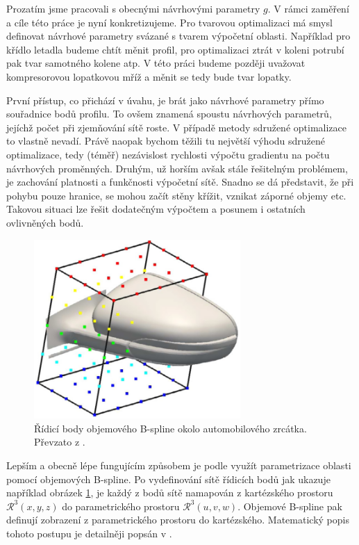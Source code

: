Prozatím jsme pracovali s obecnými návrhovými parametry $ g $. V rámci zaměření a cíle této práce je nyní konkretizujeme. Pro tvarovou optimalizaci má smysl definovat návrhové parametry svázané s tvarem výpočetní oblasti. Například pro křídlo letadla budeme chtít měnit profil, pro optimalizaci ztrát v koleni potrubí pak tvar samotného kolene atp. V této práci budeme později uvažovat kompresorovou lopatkovou mříž a měnit se tedy bude tvar lopatky.

První přístup, co přichází v úvahu, je brát jako návrhové parametry přímo souřadnice bodů profilu. To ovšem znamená spoustu návrhových parametrů, jejíchž počet při zjemňování sítě roste. V případě metody sdružené optimalizace to vlastně nevadí. Právě naopak bychom těžili tu největší výhodu sdružené optimalizace, tedy (téměř) nezávislost rychlosti výpočtu gradientu na počtu návrhových proměnných. Druhým, už horším avšak stále řešitelným problémem, je zachování platnosti a funkčnosti výpočetní sítě. Snadno se dá představit, že při pohybu pouze hranice, se mohou začít stěny křížit, vznikat záporné objemy etc. Takovou situaci lze řešit dodatečným výpočtem a posunem i ostatních ovlivněných bodů. 
\begin{figure}
	\includegraphics[width=0.7\textwidth]{./img/ridici_body.png}
	\caption[Řídicí body objemového B-spline ve 3D]{Řídicí body objemového B-spline okolo automobilového zrcátka. Převzato z \cite{papoutsis2015noise}.}
	\label{fig:zrcatko}
\end{figure}
Lepším a obecně lépe fungujícím způsobem je podle \cite{adjoint2020foam} využít parametrizace oblasti pomocí objemových B-spline.
Po vydefinování sítě řídicích bodů jak ukazuje například obrázek \ref{fig:zrcatko}, je každý z bodů sítě namapován z kartézského prostoru $ \mathcal{R}^3(x,y,z) $ do parametrického prostoru $ \mathcal{R}^3(u,v,w) $.
Objemové B-spline pak definují zobrazení z parametrického prostoru do kartézského. 
Matematický popis tohoto postupu je detailněji popsán v \cite{papoutsis2015noise}. 

